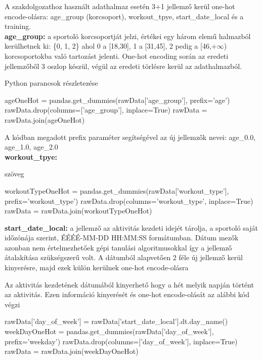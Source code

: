 A szakdolgozathoz használt adathalmaz esetén 3+1 jellemző kerül one-hot encode-olásra: age\_group (korcsoport), workout\_tpye, start\_date\_local és a training.\\[6pt]

\textbf{age\_group:} a sportoló korcsoportját jelzi, értékei egy három elemű halmazból kerülhetnek ki: \{0, 1, 2\} ahol 0 a [18,30], 1 a [31,45], 2 pedig a [46,$+\infty$) korcsoportokba való tartozást jelenti. One-hot encoding során az eredeti jellemzőből 3 oszlop készül, végül az eredeti törlésre kerül az adathalmazból.
\begin{programreszlet}
Python parancsok részletezése
\begin{python}
ageOneHot = pandas.get_dummies(rawData['age_group'], prefix='age')
rawData.drop(columns=['age_group'], inplace=True)
rawData = rawData.join(ageOneHot)
\end{python}
\end{programreszlet}
A kódban megadott prefix paraméter segítségével az új jellemzők nevei: age\_0.0, age\_1.0, age\_2.0\\[6pt]


\textbf{workout\_tpye:} 

\begin{programreszlet}
	\TODO szöveg
\begin{python}
workoutTypeOneHot = pandas.get_dummies(rawData['workout_type'],
				       prefix='workout_type')
rawData.drop(columns='workout_type', inplace=True)
rawData = rawData.join(workoutTypeOneHot)
\end{python}
\end{programreszlet}


\textbf{start\_date\_local:} a jellemző az aktivitás kezdeti idejét tárolja, a sportoló saját időzónája szerint, ÉÉÉÉ-MM-DD HH:MM:SS formátumban. Dátum mezők azonban nem értelmezhetőek gépi tanulási algoritmusokkal így a jellemző átalakítása szükségszerű volt. A dátumból alapvetően 2 féle új jellemző kerül kinyerésre, majd ezek külön kerülnek one-hot encode-olásra

\begin{programreszlet}
Az aktivitás kezdetének dátumából kinyerhető hogy a hét melyik napján történt az aktivitás. Ezen információ kinyerését és one-hot encode-olását az alábbi kód végzi
\begin{python}
rawData['day_of_week'] = rawData['start_date_local'].dt.day_name()
weekDayOneHot = pandas.get_dummies(rawData['day_of_week'], 
				   prefix='weekday')
rawData.drop(columns=['day_of_week'], inplace=True)
rawData = rawData.join(weekDayOneHot)
\end{python}		
\end{programreszlet}

